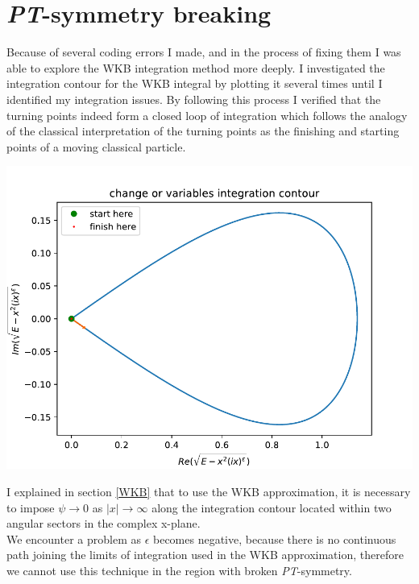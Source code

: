 \documentclass[10pt, a4paper, singlespacing, headsepline]{report}
\newenvironment{Figure}
    {\par\medskip\noindent\minipage{\linewidth}}
    {\endminipage\par\medskip}
\newcommand\PT{\emph{PT}}
\begin{document}
\section{\PT-symmetry breaking}\label{PT breaking}
Because of several coding errors I made, and in the process of fixing them I was able to explore the WKB integration method more deeply. I investigated the integration contour for the WKB integral by plotting it several times until I identified my integration issues. By following this process I verified that the turning points indeed form a closed loop of integration which follows the analogy of the classical interpretation of the turning points as the finishing and starting points of a moving classical particle.
\begin{Figure}
 \centering
 \includegraphics[width=0.75\linewidth]{integration_contour.pdf}
\end{Figure}
I explained in section \ref{WKB} that to use the WKB approximation, it is necessary to impose $\psi \rightarrow 0$ as $|x| \rightarrow \infty$ along the integration contour located within two angular sectors in the complex x-plane.\\ We encounter a problem as $\epsilon$ becomes negative, because there is no continuous path joining the limits of integration used in the WKB approximation, therefore we cannot use this technique in the region with broken \PT-symmetry.\\
\end{document}
